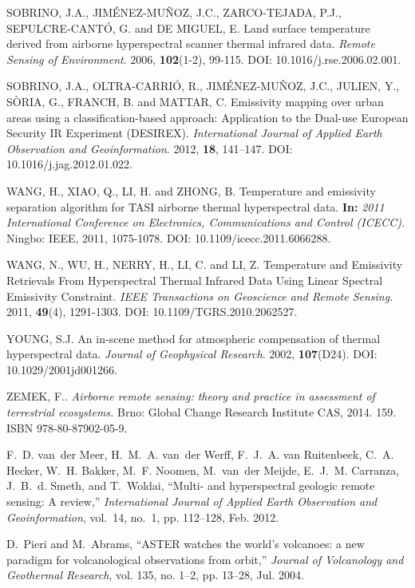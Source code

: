 \begin{thebibliography}{10}
 SOBRINO, J.A., JIMÉNEZ-MUÑOZ, J.C., ZARCO-TEJADA, P.J., SEPULCRE-CANTÓ, G. and DE MIGUEL, E. Land surface temperature derived from airborne hyperspectral scanner thermal infrared data. \textit{Remote Sensing of Environment}. 2006, \textbf{102}(1-2), 99-115. DOI: 10.1016/j.rse.2006.02.001.

 SOBRINO, J.A., OLTRA-CARRIÓ, R., JIMÉNEZ-MUÑOZ, J.C., JULIEN, Y., SÒRIA, G., FRANCH, B. and MATTAR, C. Emissivity mapping over urban areas using a classification-based approach: Application to the Dual-use European Security IR Experiment (DESIREX). \textit{International Journal of Applied Earth Observation and Geoinformation}. 2012, \textbf{18}, 141–147. DOI: 10.1016/j.jag.2012.01.022.

 WANG, H., XIAO, Q., LI, H. and ZHONG, B. Temperature and emissivity separation algorithm for TASI airborne thermal hyperspectral data. \textbf{In:} \textit{2011 International Conference on Electronics, Communications and Control (ICECC)}. Ningbo: IEEE, 2011, 1075-1078. DOI: 10.1109/icecc.2011.6066288.

 WANG, N., WU, H., NERRY, H., LI, C. and LI, Z. Temperature and Emissivity Retrievals From Hyperspectral Thermal Infrared Data Using Linear Spectral Emissivity Constraint. \textit{IEEE Transactions on Geoscience and Remote Sensing}. 2011, \textbf{49}(4), 1291-1303. DOI: 10.1109/TGRS.2010.2062527.

 YOUNG, S.J. An in-scene method for atmospheric compensation of thermal hyperspectral data. \textit{Journal of Geophysical Research}. 2002, \textbf{107}(D24). DOI: 10.1029/2001jd001266.

 ZEMEK, F.. \textit{Airborne remote sensing: theory and practice in assessment of terrestrial ecosystems.} Brno: Global Change Research Institute CAS, 2014. 159. ISBN 978-80-87902-05-9.




F.~D. van~der Meer, H.~M.~A. van~der Werff, F.~J.~A. van Ruitenbeek, C.~A.
  Hecker, W.~H. Bakker, M.~F. Noomen, M.~van~der Meijde, E.~J.~M. Carranza,
  J.~B.~d. Smeth, and T.~Woldai, ``Multi- and hyperspectral geologic remote
  sensing: {A} review,'' \emph{International Journal of Applied Earth
  Observation and Geoinformation}, vol.~14, no.~1, pp. 112--128, Feb. 2012.

D.~Pieri and M.~Abrams, ``{ASTER} watches the world's volcanoes: a new paradigm
  for volcanological observations from orbit,'' \emph{Journal of Volcanology
  and Geothermal Research}, vol. 135, no. 1–2, pp. 13--28, Jul. 2004.


\end{thebibliography}
